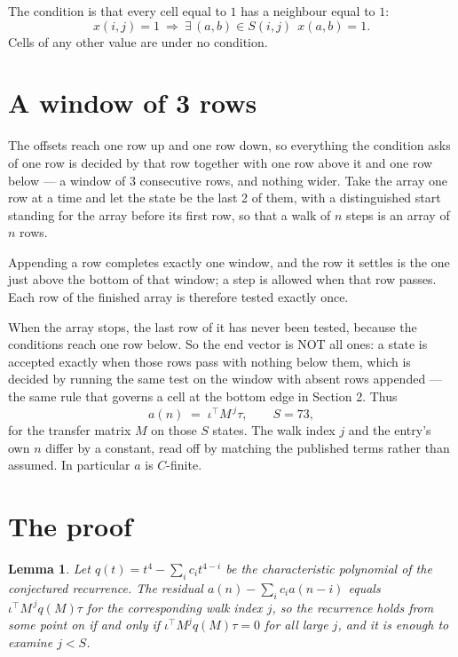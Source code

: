\documentclass[11pt,a4paper]{article}
\theoremstyle{plain}
\newtheorem{lemma}[theorem]{Lemma}
\theoremstyle{definition}
\begin{document}
The condition is that every cell equal to $1$ has a neighbour equal to $1$:
\[
x(i,j)=1\ \Longrightarrow\ \exists\,(a,b)\in S(i,j)\ \ x(a,b)=1 .
\]
Cells of any other value are under no condition.

\section{A window of 3 rows}

The offsets reach one row up and one row down, so everything the condition asks of one row is
decided by that row together with one row above it and one row below --- a window of
$3$ consecutive rows, and nothing wider. Take the array one row at a time and
let the state be the last 2 of them, with a distinguished start standing for the array before its
first row, so that a walk of $n$ steps is an array of $n$ rows.

Appending a row completes exactly one window, and the row it settles is the one just above the bottom of that window; a step is
allowed when that row passes. Each row of the finished array is therefore tested exactly once.

When the array stops, the last row of it has never been tested, because the
conditions reach one row below. So the end vector is NOT all ones: a state is accepted exactly when
those rows pass with nothing below them, which is decided by running the same test on the window
with absent rows appended --- the same rule that governs a cell at the bottom edge in
Section 2.
Thus
\[
a(n)\;=\;\iota^{\!\top}M^{\,j}\tau ,\qquad S=73,
\]
for the transfer matrix $M$ on those $S$ states. The walk index $j$ and the entry's own $n$
differ by a constant, read off by matching the published terms rather than assumed. In
particular $a$ is $C$-finite.

\section{The proof}

\begin{lemma}\label{lem:crit}
Let $q(t)=t^{4}-\sum_i c_it^{4-i}$ be the characteristic polynomial of the
conjectured recurrence. The residual $a(n)-\sum_ic_ia(n-i)$ equals
$\iota^{\!\top}M^{\,j}q(M)\tau$ for the corresponding walk index $j$, so the recurrence
holds from some point on if and only if $\iota^{\!\top}M^{j}q(M)\tau=0$ for all large $j$,
and it is enough to examine $j<S$.
\end{lemma}
\end{document}
